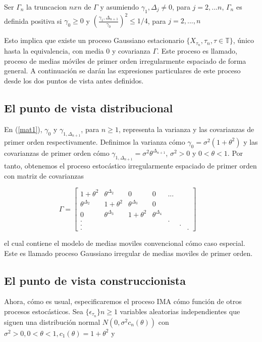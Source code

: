 Ser $\Gamma_n$ la truncacion $nxn$ de $\Gamma$ y asumiendo $\gamma_1,\Delta_j\neq 0$, para $j=2,...n$, $\Gamma_n$ 
es definida positiva si $\gamma_0 \geq 0$ y $(\frac{\gamma_1,\Delta_{n+1}}{\gamma_0})^2 \leq 1/4$, para $j=2,...,n$

Esto implica que existe un proceso Gaussiano estacionario $\lbrace X_{\tau_n},\tau_n, \tau \in \mathbb{T}\rbrace$, 
único hasta la equivalencia, con media 0 y covarianza $\Gamma$. Este proceso es llamado, proceso de medias móviles
 de primer orden irregularmente espaciado de forma general. A continuación se darán las expresiones particulares 
 de este proceso desde los dos puntos de vista antes definidos.

\subsection{El punto de vista distribucional}
En (\ref{mat1}), $\gamma_0$ y $\gamma_{1,\Delta_{n+1}}$, para $n\geq1$, representa la varianza y las covarianzas 
de primer orden respectivamente. Definimos la varianza cómo $\gamma_0=\sigma^2(1+\theta^2)$ y las covarianzas de 
primer orden cómo $\gamma_{1,\Delta_{n+1}}=\sigma^2 \theta^{\Delta_{n+1}}$, $\sigma^2 >0$ y $0<\theta <1$. 
Por tanto, obtenemos el proceso estocástico irregularmente espaciado de primer orden con matriz de covarianzas

\begin{equation}
    \Gamma=
	\begin{bmatrix} 
	1+\theta^2 & \theta^{\Delta_2} & 0 & 0 & ... \\
	\theta^{\Delta_2} & 1+\theta^2 & \theta^{\Delta_3}& 0\\
	0 & \theta^{\Delta_3} & 1+\theta^2 & \theta^{\Delta_4} \\
	.& & & & . \\
	.& & & & & .\\
	. & & & & & & .
	\end{bmatrix}
	\quad
	\label{mat2}
\end{equation}

el cual contiene el modelo de medias moviles convencional cómo caso especial. Este es llamado proceso Gaussiano 
irregular de medias moviles de primer orden.

\subsection{El punto de vista construccionista}

Ahora, cómo es usual, especificaremos el proceso IMA cómo función de otros procesos estocásticos. 
Sea $\lbrace \epsilon_{\tau_n}\rbrace n\geq 1$ variables aleatorias independientes que siguen una distribución 
normal $N(0,\sigma^2 c_n(\theta))$ con $\sigma^2 >0, 0<\theta<1, c_1(\theta)=1+\theta^2$ y

